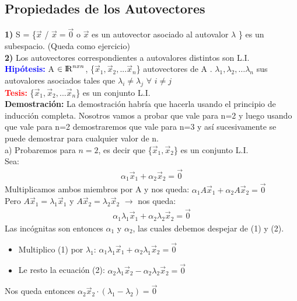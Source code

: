 \documentclass{article}
\begin{document}
\subsection{Propiedades de los Autovectores}
\textbf{1)} S = \{$\vec{x}$ / $\vec{x} = \vec{0}$ o $\vec{x}$ es un autovector asociado al autovalor $\lambda$ \} es un subespacio. (Queda como ejercicio)\\
\textbf{2)} Los autovectores correspondientes a autovalores distintos son L.I.\\
{\bfseries \textcolor{blue}{Hipótesis:}} A $\in {\rm I\!R}^{nxn}$, \{$\vec{x}_{1}, \vec{x}_2,... \vec{x}_n $\} autovectores de A . $\lambda_{1}, \lambda_{2},\ldots \lambda_{n}$ sus autovalores asociados tales que $\lambda_i \neq \lambda_j$ $\forall$ $i\neq j$ \\
{\bfseries \textcolor{red}{Tesis:}} \{$\vec{x}_{1}, \vec{x}_2,... \vec{x}_n $\} es un conjunto L.I.\\
\textbf{Demostración:} La demostración habría que hacerla usando el principio de inducción completa. Nosotros vamos a probar que vale para n=2 y luego usando que vale para n=2 demostraremos que vale para n=3 y así sucesivamente se puede demostrar para cualquier valor de n.\\
a) Probaremos para $n=2$, es decir que \{$\vec{x}_{1}, \vec{x}_2$\} es un conjunto L.I. \\
Sea: 
\begin{align}
\alpha_1\vec{x}_1+\alpha_2\vec{x}_2 = \vec{0}
\end{align}
Multiplicamos ambos miembros por A y nos queda: $\alpha_{1}A\vec{x}_1+\alpha_{2}A\vec{x}_2 = \vec{0}$\\
Pero $A\vec{x}_1 = \lambda_1\vec{x}_1$ y $A\vec{x}_2 = \lambda_2\vec{x}_2$ $\rightarrow$ nos queda:
\begin{align}
\alpha_1\lambda_1\vec{x}_1+\alpha_2\lambda_2\vec{x}_2 = \vec{0}
\end{align}
Las incógnitas son entonces $\alpha_1$ y $\alpha_2$, las cuales debemos despejar de (1) y (2).
\begin{itemize}
\item Multiplico (1) por $\lambda_1$: $\alpha_1\lambda_1\vec{x}_1+\alpha_2\lambda_1\vec{x}_2 = \vec{0}$ 
\item Le resto la ecuación (2): $\alpha_2\lambda_1\vec{x}_2 - \alpha_2\lambda_2\vec{x}_2=\vec{0}$
\end{itemize}
Nos queda entonces $\alpha_2\vec{x}_2\cdot(\lambda_1-\lambda_2)=\vec{0}$\\
\end{document}

